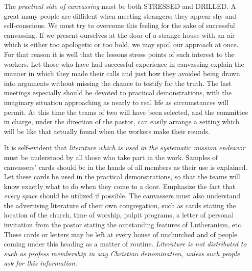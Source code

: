 \documentclass[
]{book}
\begin{document}
The \emph{practical side of canvassing} must be both STRESSED and DRILLED. A great many people are diffident when meeting strangers; they appear shy and self-conscious. We must try to overcome this feeling for the sake of successful canvassing. If we present ourselves at the door of a strange house with an air which is either too apologetic or too bold, we may spoil our approach at once. For that reason it is well that the lessons stress points of such interest to the workers. Let those who have had successful experience in canvassing explain the manner in which they made their calls and just how they avoided being drawn into arguments without missing the chance to testify for the truth. The last meetings especially should be devoted to practical demonstrations, with the imaginary situation approaching as nearly to real life as circumstances will permit. At this time the teams of two will have been selected, and the committee in charge, under the direction of the pastor, can easily arrange a setting which will be like that actually found when the workers make their rounds.

It is self-evident that \emph{literature which is used in the systematic mission endeavor} must be understood by all those who take part in the work. Samples of canvassers' cards should be in the hands of all members as their use is explained. Let these cards be used in the practical demonstrations, so that the teams will know exactly what to do when they come to a door. Emphasize the fact that \emph{every space} should be utilized if possible. The canvassers must also understand the advertising literature of their own congregation, such as cards stating the location of the church, time of worship, pulpit programs, a letter of personal invitation from the pastor stating the outstanding features of Lutheranism, etc. These cards or letters may be left at every house of unchurched and of people coming under this heading as a matter of routine. \emph{Literature is not distributed to such as profess membership in any Christian denomination, unless such people ask for this information}.
\end{document}
